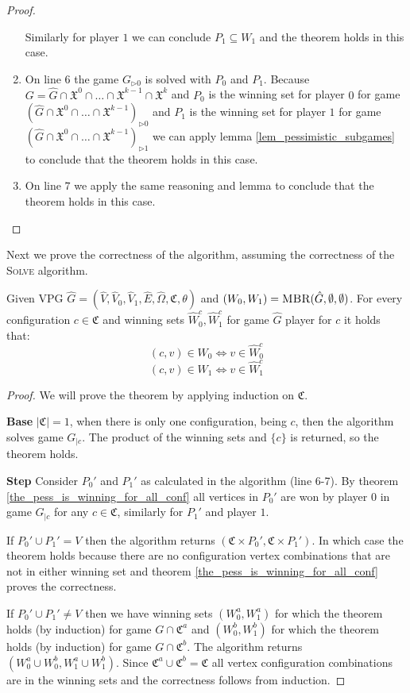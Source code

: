 \begin{theorem}
\begin{proof}
\begin{enumerate}
			Similarly for player $1$ we can conclude $P_1 \subseteq W_1$ and the theorem holds in this case.
			\item On line $6$ the game $G_{\triangleright0}$ is solved with $P_0$ and $P_1$. Because $G = \hat{G} \cap \mathfrak{X}^0 \cap \dots \cap \mathfrak{X}^{k-1} \cap \mathfrak{X}^k$ and $P_0$ is the winning set for player $0$ for game $(\hat{G} \cap \mathfrak{X}^0 \cap \dots \cap \mathfrak{X}^{k-1})_{\triangleright0}$ and $P_1$ is the winning set for player $1$ for game $(\hat{G} \cap \mathfrak{X}^0 \cap \dots \cap \mathfrak{X}^{k-1})_{\triangleright1}$ we can apply lemma \ref{lem_pessimistic_subgames} to conclude that the theorem holds in this case.
			\item On line $7$ we apply the same reasoning and lemma to conclude that the theorem holds in this case.
		\end{enumerate}
	\end{proof}
\end{theorem}

Next we prove the correctness of the algorithm, assuming the correctness of the \textsc{Solve} algorithm.
\begin{theorem}
	Given VPG $\hat{G} = (\hat{V},\hat{V}_0,\hat{V}_1,\hat{E},\hat{\Omega},\mathfrak{C},\theta)$ and $(W_0,W_1) = \textsc{MBR}(\hat{G},\emptyset,\emptyset)$. For every configuration $c \in \mathfrak{C}$ and winning sets $\hat{W}_0^c, \hat{W}_1^c$ for game $\hat{G}$ player for $c$ it holds that:
	\[ (c,v) \in W_0 \iff v \in \hat{W}_0^c \]
	\[ (c,v) \in W_1 \iff v \in \hat{W}_1^c \]
	\begin{proof}
		We will prove the theorem by applying induction on $\mathfrak{C}$.
		
		\textbf{Base} $|\mathfrak{C}| = 1$, when there is only one configuration, being $c$, then the algorithm solves game $G_{|c}$. The product of the winning sets and $\{c\}$ is returned, so the theorem holds.
		
		\textbf{Step} Consider $P_0'$ and $P_1'$ as calculated in the algorithm (line 6-7). By theorem \ref{the_pess_is_winning_for_all_conf} all vertices in $P_0'$ are won by player $0$ in game $G_{|c}$ for any $c \in \mathfrak{C}$, similarly for $P_1'$ and player $1$.
		
		If $P_0' \cup P_1' = V$ then the algorithm returns $(\mathfrak{C} \times P_0',\mathfrak{C} \times P_1')$. In which case the theorem holds because there are no configuration vertex combinations that are not in either winning set and theorem \ref{the_pess_is_winning_for_all_conf} proves the correctness.
		
		If $P_0' \cup P_1' \neq V$ then we have winning sets $(W_0^a, W_1^a)$ for which the theorem holds (by induction) for game $G \cap \mathfrak{C}^a$ and $(W_0^b, W_1^b)$ for which the theorem holds (by induction) for game $G \cap \mathfrak{C}^b$. The algorithm returns $(W_0^a \cup W_0^b, W_1^a \cup W_1^b)$. Since $\mathfrak{C}^a \cup \mathfrak{C}^b = \mathfrak{C}$ all vertex configuration combinations are in the winning sets and the correctness follows from induction.
	\end{proof}
\end{theorem}